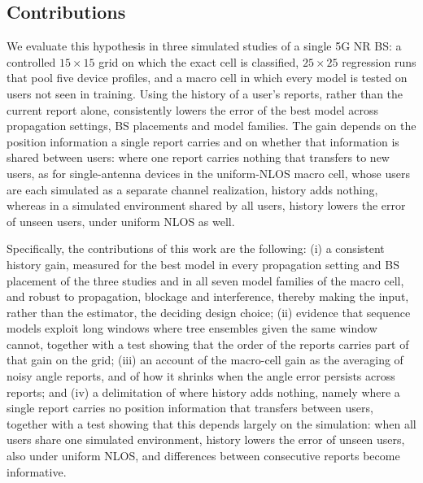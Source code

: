\subsection{Contributions}
\label{subsec:contributions}

We evaluate this hypothesis in three simulated studies of a single 5G NR BS: a controlled $15\times15$ grid on which the exact cell is classified, $25\times25$ regression runs that pool five device profiles, and a macro cell in which every model is tested on users not seen in training. Using the history of a user's reports, rather than the current report alone, consistently lowers the error of the best model across propagation settings, BS placements and model families. The gain depends on the position information a single report carries and on whether that information is shared between users: where one report carries nothing that transfers to new users, as for single-antenna devices in the uniform-NLOS macro cell, whose users are each simulated as a separate channel realization, history adds nothing, whereas in a simulated environment shared by all users, history lowers the error of unseen users, under uniform NLOS as well.

Specifically, the contributions of this work are the following: (i) a consistent history gain, measured for the best model in every propagation setting and BS placement of the three studies and in all seven model families of the macro cell, and robust to propagation, blockage and interference, thereby making the input, rather than the estimator, the deciding design choice; (ii) evidence that sequence models exploit long windows where tree ensembles given the same window cannot, together with a test showing that the order of the reports carries part of that gain on the grid; (iii) an account of the macro-cell gain as the averaging of noisy angle reports, and of how it shrinks when the angle error persists across reports; and (iv) a delimitation of where history adds nothing, namely where a single report carries no position information that transfers between users, together with a test showing that this depends largely on the simulation: when all users share one simulated environment, history lowers the error of unseen users, also under uniform NLOS, and differences between consecutive reports become informative.

